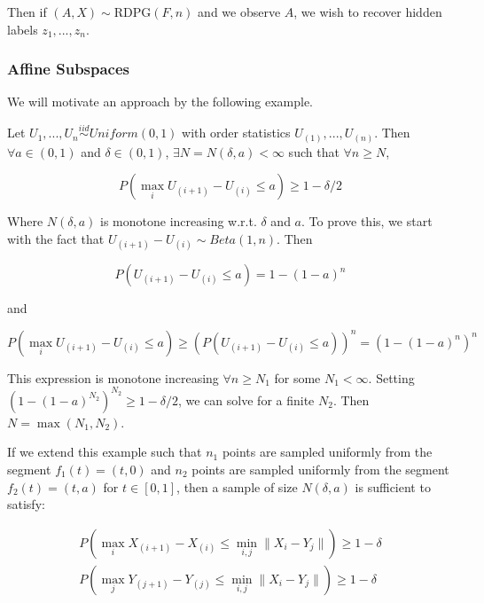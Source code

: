\documentclass[
  11pt,
]{article}
\begin{document}
Then if \((A, X) \sim \text{RDPG}(F, n)\) and we observe \(A\), we wish
to recover hidden labels \(z_1, ..., z_n\).

\hypertarget{affine-subspaces}{%
\subsubsection{Affine Subspaces}\label{affine-subspaces}}

We will motivate an approach by the following example.

\begin{example}
Let $U_1, ..., U_n \stackrel{iid}{\sim} Uniform(0, 1)$ with order statistics 
$U_{(1)}, ..., U_{(n)}$. Then $\forall a \in (0, 1)$ and $\delta \in (0, 1)$, $\exists N = N(\delta, a) < \infty$ such that $\forall n \geq N$, 

\begin{equation}
P(\max_i U_{(i+1)} - U_{(i)} \leq a) \geq 1 - \delta / 2
\end{equation}

Where $N(\delta, a)$ is monotone increasing w.r.t. $\delta$ and $a$. To prove this, we start with the fact that $U_{(i+1)} - U_{(i)} \sim Beta(1, n)$. Then 

\begin{equation}
P(U_{(i+1)} - U_{(i)} \leq a) = 1 - (1 - a)^n
\end{equation}

and 

\begin{equation}
\label{eq:unsolvable}
P(\max_i U_{(i+1)} - U_{(i)} \leq a) \geq (P(U_{(i+1)} - U_{(i)} \leq a))^n = (1 - (1 - a)^n)^n
\end{equation}

This expression is monotone increasing $\forall n \geq N_1$ for some $N_1 < \infty$. 
Setting $(1 - (1 - a)^{N_2})^{N_2} \geq 1 - \delta / 2$, we can solve for a finite ${N_2}$. Then $N = \max(N_1, N_2)$.
\end{example}

If we extend this example such that \(n_1\) points are sampled uniformly
from the segment \(f_1(t) = (t, 0)\) and \(n_2\) points are sampled
uniformly from the segment \(f_2(t) = (t, a)\) for \(t \in [0, 1]\),
then a sample of size \(N(\delta, a)\) is sufficient to satisfy:

\begin{equation}
\begin{split}
P(\max_i X_{(i+1)} - X_{(i)} \leq \min_{i, j} \|X_i - Y_j\|) \geq 1 - \delta \\
P(\max_j Y_{(j+1)} - Y_{(j)} \leq \min_{i, j} \|X_i - Y_j\|) \geq 1 - \delta
\end{split}
\end{equation}
\end{document}
